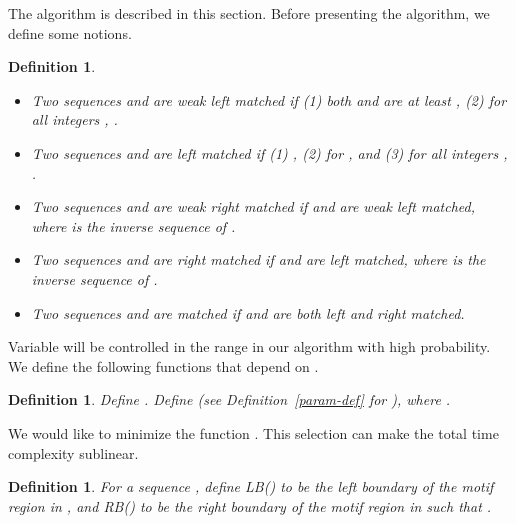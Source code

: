 \documentclass[11pt]{article}
\newtheorem{dfntn}[theoremfoo]{Definition}
\newenvironment{definition}{\pagebreak[1]\begin{dfntn}\rm}{\end{dfntn}}
\newcommand{\scrod}{\quad\nopagebreak}
\newcommand{\LB}{{\rm LB}}
\newcommand{\RB}{{\rm RB}}
\begin{document}
The algorithm is described in this section. Before presenting the
algorithm, we define some notions.



\begin{definition}\label{match-def}{\scrod}
\begin{itemize}
\item
Two sequences  and  are {\it weak left matched} if (1)
both  and  are at least , (2)
 for all integers , .

\item
Two sequences  and  are {\it left matched} if (1) , (2)  for , and
(3)  for all integers , .

\item
Two sequences  and  are {\it weak right matched} if
 and  are weak left matched, where 
is the inverse sequence of .

\item
Two sequences  and  are {\it right matched} if  and
 are left matched, where  is the inverse
sequence of .

\item
Two sequences  and  are {\it matched} if  and 
are both left and right matched.
\end{itemize}
\end{definition}


Variable  will be controlled in the range  in our algorithm with
high probability. We define the following functions that depend on
.

\begin{definition}\label{M-M1-def}
Define .
 Define  (see
Definition~\ref{param-def} for ), where .
\end{definition}

We would like to
minimize the function . This selection can
make the total time complexity sublinear.





















\begin{definition}
For a  sequence , define \LB() to be the
left boundary  of the motif region  in , and
\RB() to be the right boundary  of the motif region
 in  such that .
\end{definition}
\end{document}
